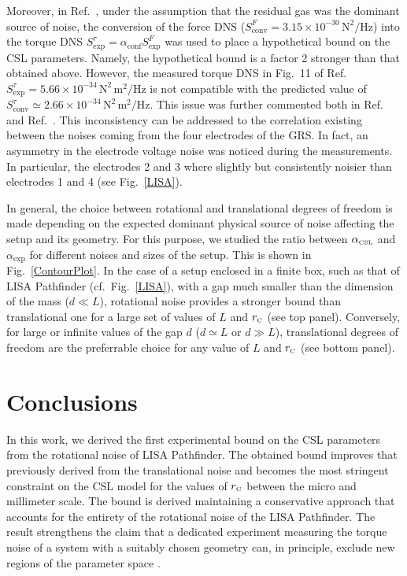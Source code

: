\documentclass[aps,twocolumn,pra,superscriptaddress]{revtex4-2}
\newcommand\rC{r_\text{\tiny C}}
\begin{document}
{Moreover, in Ref.~\cite{carlesso2018non}, {under the assumption that the residual gas was the dominant source of noise}, the conversion of the force DNS ($S^F_{\text{conv}}=3.15\times 10^{-30}\, \mathrm{N^2}/\mathrm{Hz}$) into the torque DNS $S^\tau_{\text{exp}}=\alpha_{\text{conf}}S^F_{\text{exp}}$ 
was used to place a hypothetical bound on the CSL parameters. Namely, the hypothetical bound is a factor 2 stronger than that obtained above.
However, the measured torque DNS in Fig.~11 of Ref.~\cite{armano2024nano} $S^\tau_\text{exp}=5.66\times10^{-34}\,\mathrm{N^2}\, \mathrm{m^2}/\mathrm{Hz}$ is not compatible with the predicted value of $S^\tau_{\text{conv}}\simeq2.66\times10^{-34}\,\mathrm{N^2}\, \mathrm{m^2}/\mathrm{Hz}$. 
This issue was further commented both in Ref.~\cite{armano2024nano} and Ref.~\cite{armano2024depth}.
This inconsistency can be addressed to the correlation existing between the noises coming from the four electrodes of the GRS.
In fact, an asymmetry in the electrode voltage noise was noticed during the measurements. In particular, the electrodes 2 and 3 where slightly but consistently noisier than electrodes 1 and 4 (see Fig.~\ref{LISA}).


In general, the choice between rotational and translational degrees of freedom is made
    depending on the expected dominant physical source of noise affecting the setup and its geometry. For this purpose, we studied the ratio between $\alpha_{\text{\tiny{CSL}}}$ and $\alpha_{\text{exp}}$ for different noises and sizes of the setup. This is shown in Fig.~\ref{ContourPlot}. In the case of a setup enclosed in a finite box, such as that of LISA Pathfinder (cf.~Fig.~\ref{LISA}), with a gap much smaller than the dimension of the mass ($d\ll L$), rotational noise provides a stronger bound than translational one for a large set of values of $L$ and $\rC$ (see top panel).
Conversely, for large or infinite values of the gap $d$ ($d\simeq L$ or $d\gg L$),
translational degrees of freedom are the preferrable choice for any value of $L$ and $\rC$ (see bottom panel).

\section{Conclusions}

In this work, we derived the first experimental bound on the CSL parameters from the rotational noise of LISA Pathfinder. The obtained bound improves that previously derived from the translational noise and becomes the most stringent constraint on the CSL model for the values of $\rC$ between the micro and millimeter scale. The bound is derived  maintaining a conservative approach that accounts for the entirety of the rotational noise of the LISA Pathfinder.
The result strengthens the claim that a dedicated experiment measuring the torque noise of a system with a suitably chosen geometry can, in principle, exclude new regions of the parameter space \cite{PhysRevA.109.062212}.




}
\end{document}
